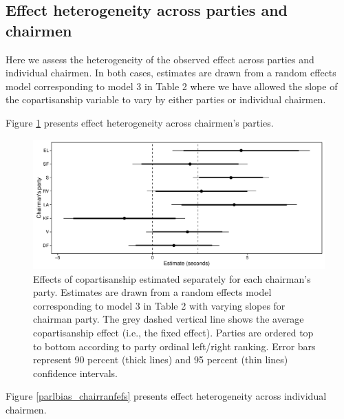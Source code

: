 \documentclass[12pt,a4paper]{article}
\begin{document}
\clearpage
\subsection{Effect heterogeneity across parties and chairmen}\label{appchairranef}

Here we assess the heterogeneity of the observed effect across parties and individual chairmen. In both cases, estimates are drawn from a random effects model corresponding to model 3 in Table 2 where we have allowed the slope of the copartisanship variable to vary by either parties or individual chairmen.

Figure \ref{partyranefs} presents effect heterogeneity across chairmen's parties.

\begin{figure}[!h]
\centering
\includegraphics[scale=.55]{../figures/parlbias_partyranefs.pdf}
\caption{Effects of copartisanship estimated separately for each chairman's party. Estimates are drawn from a random effects model corresponding to model 3 in Table 2 with varying slopes for chairman party. The grey dashed vertical line shows the average copartisanship effect (i.e., the fixed effect). Parties are ordered top to bottom according to party ordinal left/right ranking. Error bars represent 90 percent (thick lines) and 95 percent (thin lines) confidence intervals.}\label{partyranefs}
\end{figure}

Figure \ref{parlbias_chairranfefs} presents effect heterogeneity across individual chairmen.
\end{document}
